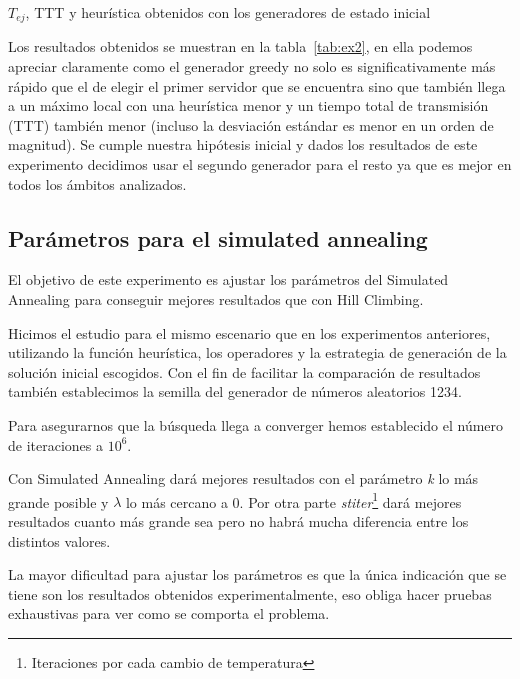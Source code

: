 \begin{table}[H]
    \caption{$T_{ej}$, TTT y heurística obtenidos con los generadores de estado inicial}%
    \label{tab:ex2}
    \begin{center}
    
    \end{center}
\end{table}

Los resultados obtenidos se muestran en la tabla~\ref{tab:ex2}, en ella
podemos apreciar claramente como el generador greedy no solo es significativamente más rápido
que el de elegir el primer servidor que se encuentra sino que también llega a un máximo local con
una heurística menor y un tiempo total de transmisión (TTT) también menor (incluso la desviación
estándar es menor en un orden de magnitud). Se cumple nuestra hipótesis inicial y
dados los resultados de este experimento decidimos usar el segundo generador para el resto ya que es
mejor en todos los ámbitos analizados.

\pagebreak

\subsection{Parámetros para el simulated annealing}

El objetivo de este experimento es ajustar los parámetros del Simulated Annealing para conseguir mejores resultados que con Hill Climbing. 

Hicimos el estudio para el mismo escenario que en los experimentos anteriores, utilizando la función heurística, los operadores y la estrategia de generación de la solución inicial escogidos. Con el fin de facilitar la comparación de resultados también establecimos la semilla del generador de números aleatorios 1234.

Para asegurarnos que la búsqueda llega a converger hemos establecido el número de iteraciones a $10^6$.

\begin{hyp*}
Con Simulated Annealing dará mejores resultados con el parámetro \emph{k} lo más grande posible y $\lambda$ lo más cercano a 0. Por otra parte \emph{stiter}\footnote{Iteraciones por cada cambio de temperatura} dará mejores resultados cuanto más grande sea pero no habrá mucha diferencia entre los distintos valores.
\end{hyp*}

La mayor dificultad para ajustar los parámetros es que la única indicación que se tiene son los resultados obtenidos experimentalmente, eso obliga hacer pruebas exhaustivas para ver como se comporta el problema.

